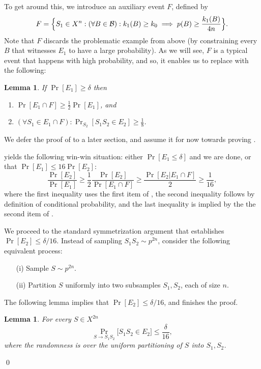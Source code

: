 \documentclass{article}
\newtheorem{lemma}[theorem]{Lemma}
\newcommand{\B}{{\cal B}}
\newcommand{\comment}[3]{\marginpar{\textcolor{#2}{#1: #3}}}
\newcommand{\yoav}[1]{\comment{Yoav}{blue}{#1}}
\begin{document}
To get around this, we introduce an auxiliary event $F$, defined by
\[F = \Bigl\{S_1\in X^{n} : (\forall B\in\B): k_{1}(B) \geq k_0 \implies p(B)\geq \frac{k_{1}(B)}{4n}\Bigr\}. \]
\yoav{I find it more natural to define the complement of $F$, i.e. the
  set of samples for which there exists a ball where the bad thing happens.}
Note that $F$ discards the problematic example from above 
(by constraining every $B$ that witnesses $E_1$ to have a large probability). 
As we will see, $F$ is a typical event that happens with high probability,
and so, it enables us to replace  with the following:
\begin{lemma}\label{lem:reduction}
If $\Pr[E_1]\geq \delta$ then 
\begin{enumerate}
\item $\Pr[E_1\cap F] \geq \frac{1}{2}\Pr[E_1]$, and
\item $(\forall S_1\in E_1\cap F): \Pr_{S_2}[S_1S_2\in E_2] \geq \frac{1}{8}$. 
\end{enumerate}
\end{lemma}
We defer the proof of  to a later section, 
and assume it for now towards proving .

 yields the following win-win situation:
either $\Pr[E_1 \leq \delta]$ and we are done, 
or that $\Pr[E_1]\leq 16\Pr[E_2]$:
\[\frac{\Pr[E_2]}{\Pr[E_1]} \geq  \frac{1}{2}\frac{\Pr[E_2]}{\Pr[E_1\cap F]} \geq \frac{\Pr[E_2 \vert E_1\cap F]}{2} \geq \frac{1}{16},\]
where the first inequality uses the first item of , 
the second inequality follows by definition of conditional probability,
and the last inequality is implied by the the second item of .


We proceed to the standard symmetrization argument
that establishes $\Pr[E_2]\leq\delta/16$. 
Instead of sampling $S_1S_2\sim p^{2n}$,
consider the following equivalent process:
\begin{itemize}
\item[(i)] Sample $S\sim p^{2n}$.
\item[(ii)] Partition $S$ uniformly into two subsamples $S_1,S_2$, each of size $n$.
\end{itemize}
The following lemma implies that $\Pr[E_2]\leq \delta/16$, and finishes the proof.
\begin{lemma}\label{lem:e2}
For every $S\in X^{2n}$
\[\Pr_{S\to S_1S_2}\bigl[S_1S_2\in E_2\bigr]\leq \frac{\delta}{16},\]
where the randomness is over the uniform partitioning
of $S$ into $S_1,S_2$.
\end{lemma}
\qed
\end{document}
